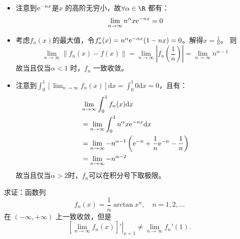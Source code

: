\begin{solution}
    \begin{itemize}
        \item 注意到\(\mathrm{e}^{-nx}\)是\(x\) 的高阶无穷小，故\(\forall \alpha
            \in \R\) 都有： \[
                \lim_{n \to \infty} n^{\alpha} x \mathrm{e}^{-n x} = 0
            \]
        \item 考虑\(f_{n}(x)\)的最大值，令\(f_{n}'(x) = n^{\alpha}
            \mathrm{e}^{-\alpha x} (1 - n x) = 0\)。解得\(x =
            \frac{1}{n}\)。
            则\[
                \lim_{n \to \infty} \left\lVert f_{n}(x) - f(x)
                \right\rVert = \lim_{n \to \infty} \left|
                f_{n}\left(\frac{1}{n}\right) \right| = \lim_{n \to
                \infty} n^{\alpha - 1}
            \]
            故当且仅当\(\alpha <  1\) 时，\(f_{n}\) 一致收敛。
        \item 注意到\(\int_0^1 \left[ \lim_{n \to \infty} f_n(x) \right]
            \mathrm{d}x = \int_0^1 0 \mathrm{d}x = 0\)，且有：
            \begin{align*}
                & \lim_{n \to \infty} \int_0^1 f_n(x) \mathrm{d}x \\
                & = \lim_{n \to \infty} \int_{0}^{1} n^{\alpha} x
                \mathrm{e}^{-nx} \mathrm{d}x                       \\
                & = \lim_{n \to \infty} -n^{\alpha - 1} \left(
                    \mathrm{e}^{-n} + \frac{1}{n}\mathrm{e}^{-n}
                -\frac{1}{n} \right)                               \\
                & = \lim_{n \to \infty} -n^{\alpha - 2}
            \end{align*}
            故当且仅当\(\alpha > 2\)时，\(f_{n}\)可以在积分号下取极限。
    \end{itemize}
\end{solution}

\begin{problem}
    求证：函数列
    \[
        f_n(x) = \frac{1}{n} \arctan x^n, \quad n = 1, 2, \dots
    \]
    在 \((-\infty, +\infty)\) 上一致收敛，但是
    \[
        \left. \left[ \lim_{n \to \infty} f_n(x) \right]'
        \right|_{x = 1}
        \neq \lim_{n \to \infty} f_n'(1).
    \]
\end{problem}

